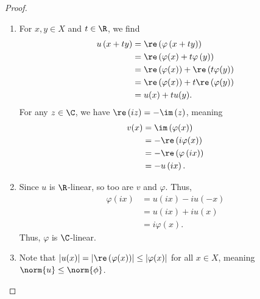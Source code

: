 \documentclass[10pt]{mypackage}
\begin{document}
  \begin{proof}\hfill
    \begin{enumerate}[(1)]
      \item For $x,y\in X$ and $t\in \R$, we find
        \begin{align*}
          u\left(x + ty\right) &= \re\left(\varphi\left(x + ty\right)\right)\\
                               &= \re\left(\varphi(x) + t\varphi\left(y\right)\right)\\
                               &= \re\left(\varphi(x)\right) + \re\left(t\varphi(y)\right)\\
                               &= \re\left(\varphi(x)\right) + t\re\left(\varphi(y)\right)\\
                               &= u(x) + tu(y).
        \end{align*}
        For any $z\in \C$, we have $\re\left(iz\right) = -\im\left(z\right)$, meaning
        \begin{align*}
          v(x) &= \im\left(\varphi(x)\right)\\
               &= -\re\left(i\varphi(x)\right)\\
               &= -\re\left(\varphi\left(ix\right)\right)\\
               &= -u\left(ix\right).
        \end{align*}
      \item Since $u$ is $\R$-linear, so too are $v$ and $\varphi$. Thus,
        \begin{align*}
          \varphi\left(ix\right) &= u\left(ix\right) - iu\left(-x\right)\\
                                 &= u\left(ix\right) + iu\left(x\right)\\
                                 &= i\varphi(x).
        \end{align*}
        Thus, $\varphi$ is $\C$-linear.
      \item Note that $\left\vert u(x) \right\vert = \left\vert \re\left(\varphi(x)\right) \right\vert \leq \left\vert \varphi(x) \right\vert$ for all $x\in X$, meaning $\norm{u}\leq \norm{\phi}$.\newline


\end{enumerate}
\end{proof}
\end{document}
